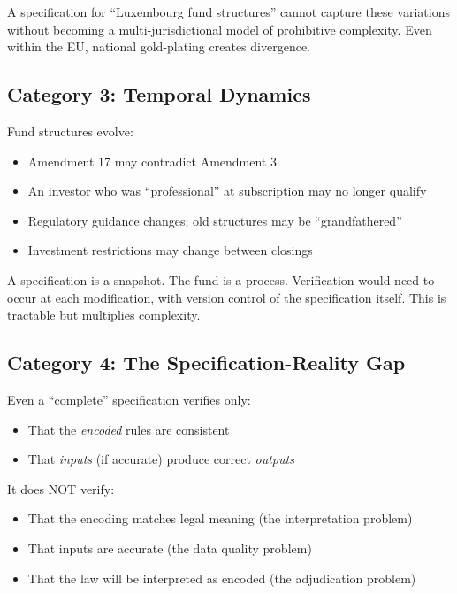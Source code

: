 A specification for ``Luxembourg fund structures'' cannot capture these variations without becoming a multi-jurisdictional model of prohibitive complexity. Even within the EU, national gold-plating creates divergence.

\subsection{Category 3: Temporal Dynamics}
\label{sec:temporal}

Fund structures evolve:

\begin{itemize}
  \item Amendment 17 may contradict Amendment 3
  \item An investor who was ``professional'' at subscription may no longer qualify
  \item Regulatory guidance changes; old structures may be ``grandfathered''
  \item Investment restrictions may change between closings
\end{itemize}

A specification is a snapshot. The fund is a process. Verification would need to occur at each modification, with version control of the specification itself. This is tractable but multiplies complexity.

\subsection{Category 4: The Specification-Reality Gap}
\label{sec:gap}

Even a ``complete'' specification verifies only:

\begin{itemize}
  \item That the \textit{encoded} rules are consistent
  \item That \textit{inputs} (if accurate) produce correct \textit{outputs}
\end{itemize}

It does NOT verify:

\begin{itemize}
  \item That the encoding matches legal meaning (the interpretation problem)
  \item That inputs are accurate (the data quality problem)
  \item That the law will be interpreted as encoded (the adjudication problem)
\end{itemize}

